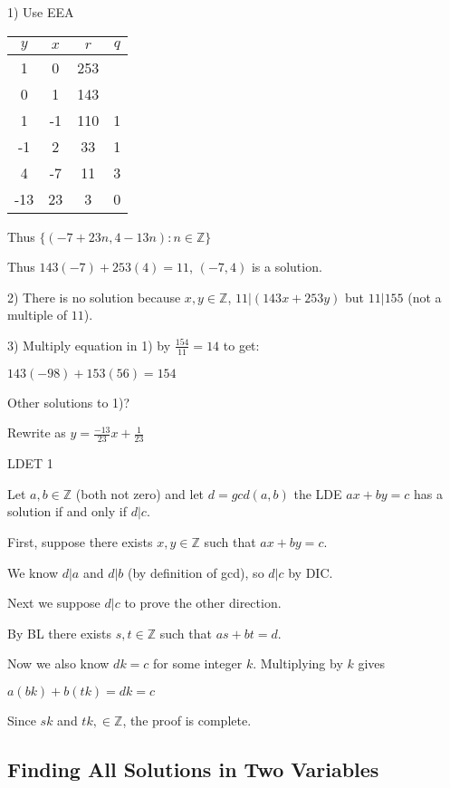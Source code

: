 \documentclass{article}
\begin{document}
1) Use EEA

\begin{table}[!h]
    \centering
    \begin{tabular}{c|c|c|c} 
         $y$&$x$& $r$ & $q$\\ \hline 
         1& 0 & 253 & \\ 
         0& 1 & 143 &\\
         1& -1 & 110 & 1\\ 
         -1& 2 & 33 & 1\\ 
         4& -7 & 11 & 3\\ 
         -13 & 23 & 3 &0 \\
    \end{tabular}
\end{table}

Thus $\{(-7+23n, 4-13n):n\in \mathbb{Z}\}$

Thus $143(-7) + 253(4) = 11$, $(-7, 4)$ is a solution.

2) There is no solution because $x,y \in \mathbb{Z}$, $11 \vert (143x + 253y)$ but $11 \vert 155$ (not a multiple of $11$).

3) Multiply equation in 1) by $\frac{154}{11} = 14$ to get: 

$143(-98) + 153(56) = 154$

Other solutions to 1)?

Rewrite as $y = \frac{-13}{23}x + \frac{1}{23}$

LDET 1

Let $a,b \in \mathbb{Z}$ (both not zero) and let $d = gcd(a,b)$ the LDE $ax + by = c$ has a solution if and only if $d \vert c$. 

First, suppose there exists $x,y \in \mathbb{Z}$ such that $ax + by = c$.

We know $d \vert a$ and $d \vert b$ (by definition of gcd), so $d \vert c$ by DIC. 

Next we suppose $d \vert c$ to prove the other direction. 

By BL there exists $s,t \in \mathbb{Z}$ such that $as + bt = d$. 

Now we also know $dk = c$ for some integer $k$. Multiplying by $k$ gives

$a(bk) + b(tk) = dk = c$

Since $sk$ and $tk, \in \mathbb{Z}$, the proof is complete.

\subsection{Finding All Solutions in Two Variables}
\end{document}
